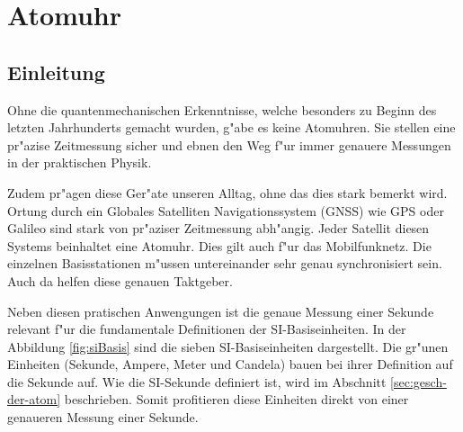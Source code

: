 \chapter{Atomuhr\label{chapter:atomuhr}}
\begin{refsection}

\section{Einleitung}
%

Ohne die quantenmechanischen Erkenntnisse, welche besonders zu Beginn des letzten Jahrhunderts gemacht wurden, g"abe es keine Atomuhren. 
Sie stellen eine pr"azise Zeitmessung sicher und ebnen den Weg f"ur immer genauere Messungen in der praktischen Physik. 

Zudem pr"agen diese Ger"ate unseren Alltag, ohne das dies stark bemerkt wird. 
Ortung durch ein Globales Satelliten Navigationssystem (GNSS) wie GPS oder Galileo sind stark von pr"aziser Zeitmessung abh"angig. 
Jeder Satellit diesen Systems beinhaltet eine Atomuhr.
Dies gilt auch f"ur das Mobilfunknetz. Die einzelnen Basisstationen m"ussen untereinander sehr genau synchronisiert sein. Auch da helfen diese genauen Taktgeber.

Neben diesen pratischen Anwengungen ist die genaue Messung einer
Sekunde relevant f"ur die fundamentale Definitionen der
SI-Basiseinheiten. In der Abbildung \ref{fig:siBasis} sind die sieben
SI-Basiseinheiten dargestellt.  Die gr"unen Einheiten (Sekunde,
Ampere, Meter und Candela) bauen bei ihrer Definition auf die Sekunde
auf.  Wie die SI-Sekunde definiert ist, wird im Abschnitt
\ref{sec:gesch-der-atom} beschrieben.  Somit profitieren diese
Einheiten direkt von einer genaueren Messung einer Sekunde.

\begin{figure}
  \centering
\end{figure}
\end{refsection}
